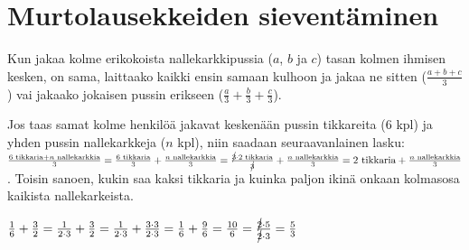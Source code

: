 \section{Murtolausekkeiden sieventäminen}


Kun jakaa kolme erikokoista nallekarkkipussia ($a$, $b$ ja $c$) tasan kolmen ihmisen kesken, on sama, laittaako kaikki ensin samaan kulhoon ja jakaa ne sitten ($\frac{a+b+c}{3}$) vai jakaako jokaisen pussin erikseen ($ \frac{a}{3} + \frac{b}{3} + \frac{c}{3}$).

Jos taas samat kolme henkilöä jakavat keskenään pussin tikkareita ($6$ kpl) ja yhden pussin nallekarkkeja ($n$ kpl), niin saadaan seuraavanlainen lasku: $ \frac{6\text{ tikkaria}+n\text{ nallekarkkia}}{3} = \frac{6\text{ tikkaria}}{3} + \frac{n\text{ nallekarkkia}}{3} = \frac{\cancel{3} \cdot 2\text{ tikkaria}}{\cancel{3}} + \frac{n\text{ nallekarkkia}}{3} = 2\text{ tikkaria} + \frac{n\text{ nallekarkkia}}{3}$. Toisin sanoen, kukin saa kaksi tikkaria ja kuinka paljon ikinä onkaan kolmasosa kaikista nallekarkeista.


\begin{esimerkki}

$ \frac{1}{6} + \frac{3}{2} = \frac{1}{2\cdot 3} + \frac{3}{2} = \frac{1}{2 \cdot 3} + \frac{3 \cdot 3}{2 \cdot 3} = \frac{1}{6} + \frac{9}{6} = \frac{10}{6} = \frac{\cancel{2} \cdot 5}{\cancel{2} \cdot 3} = \frac{5}{3}$

\end{esimerkki}

